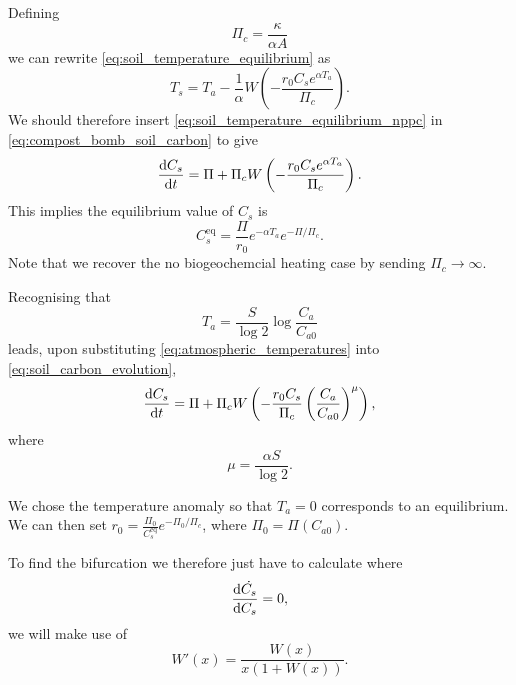 Defining
\begin{equation}
  \label{eq:critical_npp}
  \Pi_c = \frac{\kappa}{\alpha A}
\end{equation}
we can rewrite \cref{eq:soil_temperature_equilibrium} as
\begin{equation}
  \label{eq:soil_temperature_equilibrium_nppc}
  T_s = T_a - \frac{1}{\alpha} W\left(-\frac{r_0C_s e^{\alpha T_a}}{\Pi_c} \right).
\end{equation}
We should therefore insert \cref{eq:soil_temperature_equilibrium_nppc} in \cref{eq:compost_bomb_soil_carbon}
to give
\begin{equation}
  \label{eq:soil_carbon_evolution}
  \dv{C_s}{t} = \Pi + \Pi_c W\left(-\frac{r_0C_s e^{\alpha T_a}}{\Pi_c} \right).
\end{equation}
This implies the equilibrium value of $C_s$ is
\begin{equation}
  \label{eq:equilibirum_soil_carbon}
  C_s^{\mathrm{eq}} = \frac{\Pi}{r_0} e^{-\alpha T_a} e^{-\Pi/\Pi_c}.
\end{equation}
Note that we recover the no biogeochemcial heating case by sending $\Pi_c \rightarrow \infty$.


Recognising that
\begin{equation}
  \label{eq:atmospheric_temperatures}
  T_a = \frac{S}{\log 2} \log \frac{C_a}{C_{a0}} 
\end{equation}
leads, upon substituting \cref{eq:atmospheric_temperatures} into \cref{eq:soil_carbon_evolution},
\begin{equation}
  \label{eq:global_soil_carbon}
  \dv{C_s}{t} = \Pi + \Pi_c W\left(-\frac{r_0C_s}{\Pi_c} \left(\frac{C_a}{C_{a0}}\right)^\mu \right),
\end{equation}
where
\begin{equation}
  \label{eq:mu}
  \mu = \frac{\alpha S}{\log 2}.
\end{equation}


We chose the temperature anomaly so that $T_a = 0$ corresponds to an equilibrium. We can then set
$r_0 = \frac{\Pi_0}{C_s^{\mathrm{eq}}}e^{-\Pi_0/\Pi_c}$, where $\Pi_0 = \Pi\left(C_{a0}\right)$.

To find the bifurcation we therefore just have to calculate where
\begin{equation*}
  \dv{\dot{C_s}}{C_s} = 0,
\end{equation*}
we will make use of
\begin{equation}
  \label{eq:derivative_of_lambert_W}
  W'(x) = \frac{W(x)}{x\left(1 + W\left(x\right)\right)}.
\end{equation}




